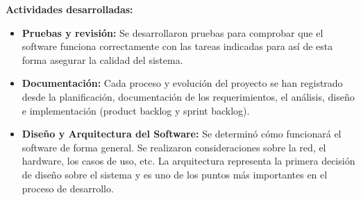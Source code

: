 \textbf{Actividades desarrolladas:}
\begin{itemize}
	\item \textbf{Pruebas y revisión: }Se desarrollaron pruebas para comprobar que el software funciona correctamente con las tareas indicadas para así de esta forma asegurar la calidad del sistema.
	\item \textbf{Documentación:} Cada proceso y evolución del proyecto se han registrado desde la planificación, documentación de los requerimientos, el análisis, diseño e implementación (product backlog y sprint backlog). 
	\item \textbf{Diseño y Arquitectura del Software: }Se determinó cómo funcionará el software de forma general. Se realizaron consideraciones sobre la red, el hardware, los casos de uso, etc. La arquitectura representa la primera decisión de diseño sobre el sistema y es uno de los puntos más importantes en el proceso de desarrollo.
\end{itemize}
\clearpage



